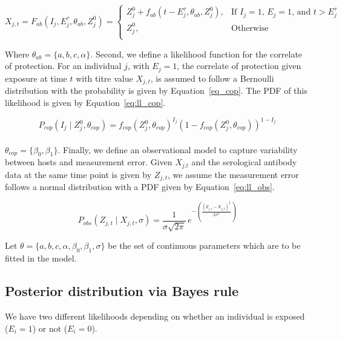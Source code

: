 \begin{equation}
\label{eq:ll_abkin}
X_{j,t}  = F_{ab}( I_j,  E_j^\tau, \theta_{ab}, Z^0_j) = 
	\begin{cases}
	Z^0_j + f_{ab}(t - E_j^\tau, \theta_{ab}, Z^0_j),  & \text{If $I_j = 1$, $E_j = 1$, and $t > E_j^\tau$} \\
	Z^0_j, & \text{Otherwise} \\ 
	\end{cases}
\end{equation}

Where $\theta_{ab} = \{a, b, c, \alpha\}$. Second, we define a likelihood function for the correlate of protection. For an individual $j$, with $E_j = 1$, the correlate of protection given exposure at time $t$ with titre value $X_{j, t}$, is assumed to follow a Bernoulli distribution with the probability is given by Equation~\ref{eq_cop}. The PDF of this likelihood is given by Equation~\ref{eq:ll_cop}.

\begin{equation}
\label{eq:ll_cop}
P_{cop}(I_j \mid Z_{j}^0, \theta_{cop} ) =  f_{cop}(Z_{j}^0,  \theta_{cop})^{I_j}(1- f_{cop}(Z_{j}^0,  \theta_{cop} ))^{1-I_j}
\end{equation}

\paragraph{}$\theta_{cop} = \{\beta_0, \beta_1\}$. Finally, we define an observational model to capture variability between hosts and measurement error. Given $X_{j.t}$ and the serological antibody data at the same time point is given by $Z_{j, t}$, we assume the measurement error follows a normal distribution with a PDF given by Equation~\ref{eq:ll_obs}.

\begin{equation}
\label{eq:ll_obs}
P_{obs}(Z_{j,t} \mid X_{j,t}, \sigma) = \frac{1}{\sigma \sqrt{2\pi}} \, e^{-\left(\frac{(Z_{j,t} - X_{j,t})^2}{2\sigma^2}\right)}
\end{equation}

Let $\theta = \{a, b, c, \alpha, \beta_0, \beta_1, \sigma\}$ be the set of continuous parameters which are to be fitted in the model. 

\subsection{Posterior distribution via Bayes rule}

We have two different likelihoods depending on whether an individual is exposed ($E_i = 1$) or not ($E_i = 0$).

